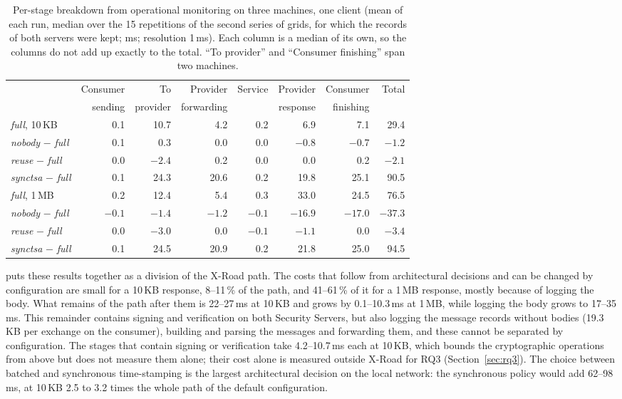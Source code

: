 \documentclass[conference,a4paper]{IEEEtran}
\newcommand{\newtext}[1]{{\color{blue}#1}}
\begin{document}
\begin{table}[!b]
\centering\small
\caption{Per-stage breakdown from operational monitoring on three machines, one client (mean of
each run, median over the 15 repetitions of the second series of grids, for which the records of both
servers were kept; ms; resolution 1\,ms). Each column is a median of its own, so the columns
do not add up exactly to the total. ``To provider'' and ``Consumer
finishing'' span two machines.}
\label{tab:stages}
\begin{tabular}{@{}lrrrrrrr@{}}
\toprule
& Consumer & To & Provider & Service & Provider & Consumer & Total \\
& sending & provider & forwarding & & response & finishing & \\
\midrule
\emph{full}, 10\,KB & 0.1 & 10.7 & 4.2 & 0.2 & 6.9 & 7.1 & 29.4 \\
\quad \emph{nobody} $-$ \emph{full} & 0.1 & 0.3 & 0.0 & 0.0 & $-0.8$ & $-0.7$ & $-1.2$ \\
\quad \emph{reuse} $-$ \emph{full} & 0.0 & $-2.4$ & 0.2 & 0.0 & 0.0 & 0.2 & $-2.1$ \\
\quad \emph{synctsa} $-$ \emph{full} & 0.1 & 24.3 & 20.6 & 0.2 & 19.8 & 25.1 & 90.5 \\
\midrule
\emph{full}, 1\,MB & 0.2 & 12.4 & 5.4 & 0.3 & 33.0 & 24.5 & 76.5 \\
\quad \emph{nobody} $-$ \emph{full} & $-0.1$ & $-1.4$ & $-1.2$ & $-0.1$ & $-16.9$ & $-17.0$ & $-37.3$ \\
\quad \emph{reuse} $-$ \emph{full} & 0.0 & $-3.0$ & 0.0 & $-0.1$ & $-1.1$ & 0.0 & $-3.4$ \\
\quad \emph{synctsa} $-$ \emph{full} & 0.1 & 24.5 & 20.9 & 0.2 & 21.8 & 25.0 & 94.5 \\
\bottomrule
\end{tabular}
\end{table}

{\color{blue}\newtext{Figure~\ref{fig:division}} puts these results together as a division of the X-Road path. The costs that
follow from architectural decisions and can be changed by configuration are small for a 10\,KB
response, 8--11\,\% of the path, and 41--61\,\% of it for a 1\,MB response, mostly because of logging
the body. What remains of the path after them is 22--27\,ms at 10\,KB and grows by 0.1--10.3\,ms
at 1\,MB, while logging the body grows to 17--35\,ms. This remainder contains signing and
verification on both Security Servers, but also logging the message records without bodies
(19.3\,KB per exchange on the consumer), building and parsing the messages and forwarding them, and
these cannot be separated by configuration. The stages that contain signing or verification take
4.2--10.7\,ms each at 10\,KB, which bounds the cryptographic operations from above but does not
measure them alone; their cost alone is measured outside X-Road for RQ3
(Section~\ref{sec:rq3}). The choice between batched and synchronous time-stamping is the largest
architectural decision on the local network: the synchronous policy would add 62--98\,ms, at 10\,KB
\newtext{2.5 to 3.2} times the whole path of the default configuration.\par}
\end{document}
